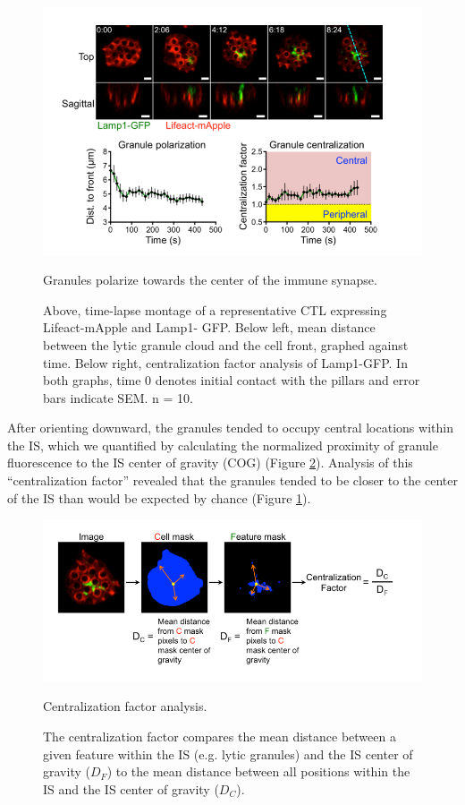 \begin{figure}[htbp]
	\centering
	\includegraphics[width=\textwidth]{../figures/chapter2/fig1granulecentralization.png}
	\caption{Granules polarize towards the center of the immune synapse.}
	\caption*{Above, time-lapse montage of a representative CTL expressing Lifeact-mApple and Lamp1- GFP. Below left, mean distance between the lytic granule cloud and the cell front, graphed against time. Below right, centralization factor analysis of Lamp1-GFP. In both graphs, time 0 denotes initial contact with the pillars and error bars indicate SEM. n = 10.}
	\label{fig:fig1granulecentralization}
\end{figure}

After orienting downward, the granules tended to occupy central locations within the IS, which we quantified by calculating the normalized proximity of granule fluorescence to the IS center of gravity (COG) (Figure \ref{fig:fig1centralizationfactor}). Analysis of this “centralization factor” revealed that the granules tended to be closer to the center of the IS than would be expected by chance (Figure \ref{fig:fig1granulecentralization}).

\begin{figure}[htbp]
	\centering
	\includegraphics[width=\textwidth]{../figures/chapter2/fig1centralizationfactor.png}
	\caption{Centralization factor analysis.}
	\caption*{The centralization factor compares the mean distance between a given feature within the IS (e.g. lytic granules) and the IS center of gravity ($D_F$) to the mean distance between all positions within the IS and the IS center of gravity ($D_C$).}
	\label{fig:fig1centralizationfactor}
\end{figure}

